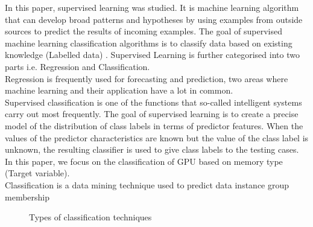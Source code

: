 	In this paper, supervised learning was studied. It is machine learning algorithm that can develop broad patterns and hypotheses by using examples from outside sources to predict the results of incoming examples. The goal of supervised machine learning classification algorithms is to classify data based on existing knowledge (Labelled data) \cite{C3}. Supervised Learning is further categorised into two parts i.e. Regression and Classification.\\
	Regression is frequently used for forecasting and prediction, two areas where machine learning and their application have a lot in common. \\
	
	Supervised classification is one of the functions that so-called intelligent systems carry out most frequently\cite{C7}. The goal of supervised learning is to create a precise model of the distribution of class labels in terms of predictor features. When the values of the predictor characteristics are known but the value of the class label is unknown, the resulting classifier is used to give class labels to the testing cases. In this paper, we focus on the classification of GPU based on memory type (Target variable).\\
	Classification is a data mining technique used to predict data instance group membership\cite{C9}\\
	\begin{figure}[H]
		\caption{Types of classification techniques}
		\label{Classification Tree Diagram}
	\end{figure}

